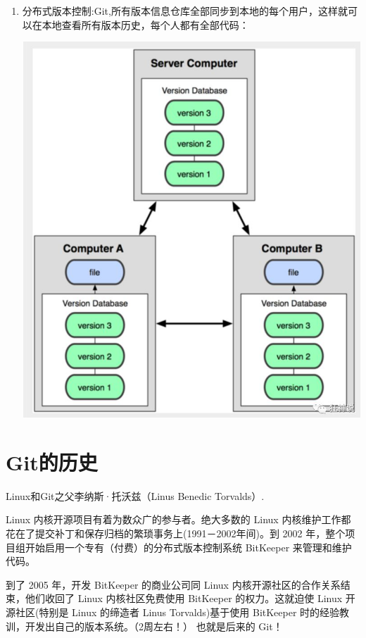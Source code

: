 \documentclass{article}
\begin{document}
\begin{enumerate}
    \item 分布式版本控制:Git,所有版本信息仓库全部同步到本地的每个用户，这样就可以在本地查看所有版本历史，每个人都有全部代码：

\centering
\includegraphics{image/2.3.png}

\end{enumerate}

\section{Git的历史}

Linux和Git之父李纳斯·托沃兹（Linus Benedic Torvalds）.

Linux 内核开源项目有着为数众广的参与者。绝大多数的 Linux 内核维护工作都花在了提交补丁和保存归档的繁琐事务上(1991－2002年间)。到 2002 年，整个项目组开始启用一个专有（付费）的分布式版本控制系统 BitKeeper 来管理和维护代码。

到了 2005 年，开发 BitKeeper 的商业公司同 Linux 内核开源社区的合作关系结束，他们收回了 Linux 内核社区免费使用 BitKeeper 的权力。这就迫使 Linux 开源社区(特别是 Linux 的缔造者 Linus Torvalds)基于使用 BitKeeper 时的经验教训，开发出自己的版本系统。（2周左右！） 也就是后来的 Git！
\end{document}
